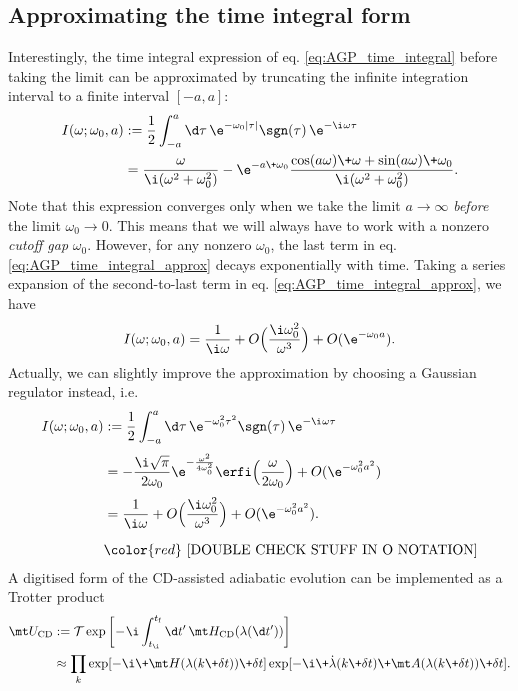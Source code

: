 \subsection{Approximating the time integral form}
Interestingly, the time integral expression of eq. \ref{eq:AGP_time_integral} before taking the limit can be approximated by truncating the infinite integration interval to a finite interval $[-a, a]$:
\begin{align}\label{eq:AGP_time_integral_approx}
I(\omega; \omega_0, a) &:= \frac12 \int_{-a}^a \d\tau \, \e^{-\omega_0|\tau|} \sgn(\tau) \, \e^{-\i \kern0.04em \omega \tau} \nonumber \\
&= \frac{\omega}{\i(\omega^2 + \omega_0^2)} - \e^{-a \+ \omega_0} \frac{\cos(a\omega) \+ \omega + \sin(a\omega) \+ \omega_0}{\i(\omega^2 + \omega_0^2)}.
\end{align}
Note that this expression converges only when we take the limit $a\to\infty$ \emph{before} the limit $\omega_0\to0$. This means that we will always have to work with a nonzero \emph{cutoff gap} $\omega_0$. However, for any nonzero $\omega_0$, the last term in eq. \ref{eq:AGP_time_integral_approx} decays exponentially with time. Taking a series expansion of the second-to-last term in eq. \ref{eq:AGP_time_integral_approx}, we have
\begin{align}
I(\omega; \omega_0, a) = \frac1{\i\omega} + O\Big( \frac{\i\omega_0^2}{\omega^3} \Big) + O(\e^{-\omega_0 a}).
\end{align}
Actually, we can slightly improve the approximation by choosing a Gaussian regulator instead, i.e.
\begin{align} \label{eq:gaussian_regulator}
    I(\omega; \omega_0, a) &:= \frac12 \int_{-a}^a \d\tau \, \e^{-\omega_0^2\tau^2} \sgn(\tau) \, \e^{-\i \kern0.04em \omega \tau} \nonumber \\[1mm]
    &= -\frac{\i \sqrt{\pi}}{2\omega_0}\e^{-\frac{\omega ^2}{4\omega_0^2}} \erfi \Big( \frac{\omega}{2 \omega_0} \Big) + O(\e^{-\omega_0^2 a^2}) \nonumber \\[1mm]
    &= \frac1{\i\omega} + O \Big( \frac{\i\omega_0^2}{\omega^3} \Big) + O(\e^{-\omega_0^2 a^2}). \\[2mm]
    & {\color{red} \text{ [DOUBLE CHECK STUFF IN O NOTATION]}} \nonumber
\end{align}
A digitised form of the CD-assisted adiabatic evolution can be implemented as a Trotter product
\begin{align}\label{eq:CD_Trotter}
\mt U_{\rm CD} &:= \mathcal T \exp \bigg[ \! -\!\i \int_{t_{\rm \i}}^{t_{\rm f}} \d t' \, \mt H_{\rm CD}(\lambda(\d t')) \bigg] \nonumber \\
&\approx \prod_k \exp[-\i \+ \mt H(\lambda(k\+\delta t)) \+ \delta t] \exp[-\i \+ \dot\lambda(k\+\delta t) \+ \mt A(\lambda(k\+\delta t)) \+ \delta t].
\end{align}
